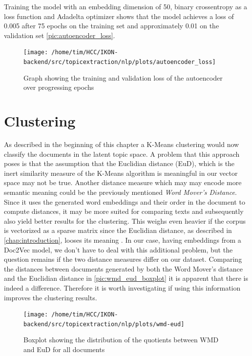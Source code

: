 Training the model with an embedding dimension of 50, binary crossentropy as a loss function and Adadelta optimizer shows that the model achieves a loss of 0.005 after 75 epochs on the training set and approximately 0.01 on the validation set \autoref{pic:autoencoder_loss}.

\begin{figure}[t]
	\centering
	\texttt{[image: /home/tim/HCC/IKON-backend/src/topicextraction/nlp/plots/autoencoder\_loss]}
	\caption{\label{pic:autoencoder_loss} Graph showing the training and validation loss of the autoencoder over progressing epochs}
\end{figure}

 

\section{Clustering}

As described in the beginning of this chapter a K-Means clustering would now classify the documents in the latent topic space. A problem that this approach poses is that the assumption that the Euclidian distance (EuD), which is the inert similarity measure of the K-Means algorithm  is meaningful in our vector space may not be true.  Another distance measure which may may encode more semantic meaning could be the previously mentioned \textit{Word Mover's Distance}. Since it uses the generated word embeddings and their order in the document to compute distances, it may be more suited for comparing texts and subsequently also yield better results for the clustering. This weighs even heavier if the corpus is vectorized as a sparse matrix since the Euclidian distance, as described in \autoref{chap:introduction}, looses its meaning . In our case, having embeddings from a Doc2Vec model, we don't have to deal with this additional problem, but the question remains if the two distance measures differ on our dataset.  
Comparing the distances between documents generated by both the Word Mover's distance and the Euclidian distance in \autoref{pic:wmd_eud_boxplot} it is apparent that there is indeed a difference. Therefore it is worth investigating if using this information improves the clustering results. 

\begin{figure}[t]
	\centering
	\texttt{[image: /home/tim/HCC/IKON-backend/src/topicextraction/nlp/plots/wmd-eud]}
	\caption{\label{pic:wmd_eud_boxplot} Boxplot showing the distribution of the quotients between WMD and EuD for all documents}
\end{figure}

